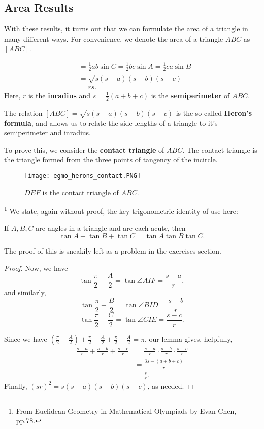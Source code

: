 \documentclass[../jarvis.tex]{subfiles}
\begin{document}
\subsection{Area Results \ez}
With these results, it turns out that we can formulate the area of a triangle in many different ways. For convenience, we denote the area of a triangle $ABC$ as $[ABC]$.
\begin{theorem}
    \begin{align*}
        [ABC] &=\frac{1}{2}ab\sin{C}=\frac{1}{2}bc\sin{A}=\frac{1}{2}ca\sin{B} \\
        &=\sqrt{s(s-a)(s-b)(s-c)} \\
        &=rs.
    \end{align*}
    Here, $r$ is the \textbf{inradius} and $s=\frac{1}{2}(a+b+c)$ is the \textbf{semiperimeter} of $ABC$.
\end{theorem}
The relation $[ABC]=\sqrt{s(s-a)(s-b)(s-c)}$ is the so-called \textbf{Heron's formula}, and allows us to relate the side lengths of a triangle to it's semiperimeter and inradius.

To prove this, we consider the \textbf{contact triangle} of $ABC$. The contact triangle is the triangle formed from the three points of tangency of the incircle.
\begin{figure}[H]
    \centering
    \texttt{[image: egmo\_herons\_contact.PNG]}
    \caption{$DEF$ is the contact triangle of $ABC$.\protect\footnotemark}
\end{figure}
\footnote{From Euclidean Geometry in Mathematical Olympiads by Evan Chen, pp.78.}
We state, again without proof, the key trigonometric identity of use here:
\begin{lemma}
    If $A,B,C$ are angles in a triangle and are each acute, then 
    $$\tan{A}+\tan{B}+\tan{C}=\tan{A}\tan{B}\tan{C}.$$
\end{lemma}
The proof of this is sneakily left as a problem in the exercises section.

\begin{proof}
    Now, we have
    $$\tan{\frac{\pi}{2}-\frac{A}{2}}=\tan{\angle AIF}=\frac{s-a}{r},$$
    and similarly,
    $$\tan{\frac{\pi}{2}-\frac{B}{2}}=\tan{\angle BID}=\frac{s-b}{r}$$
    $$\tan{\frac{\pi}{2}-\frac{C}{2}}=\tan{\angle CIE}=\frac{s-c}{r}.$$
    
    Since we have $\left(\frac{\pi}{2}-\frac{A}{2}\right)+\frac{\pi}{2}-\frac{A}{2}+\frac{\pi}{2}-\frac{A}{2}=\pi$,
    our lemma gives, helpfully,
    \begin{align*}
        \frac{s-a}{r}+\frac{s-b}{r}+\frac{s-c}{r}&=\frac{s-a}{r}\cdot\frac{s-b}{r}\cdot\frac{s-c}{r} \\
        &=\frac{3s-(a+b+c)}{r} \\
        &=\frac{s}{r}.
    \end{align*}
    Finally, $(sr)^2=s(s-a)(s-b)(s-c)$, as needed.
\end{proof}
\end{document}
